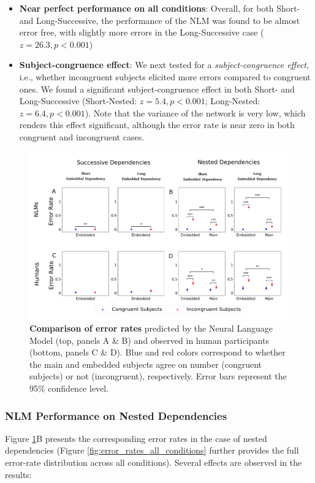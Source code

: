 \begin{itemize}
    \item \textbf{Near perfect performance on all conditions}: Overall, for both Short- and Long-Successive, the performance of the NLM was found to be almost error free, with slightly more errors in the Long-Successive case ($z=26.3, p<0.001$)
    \item \textbf{Subject-congruence effect}: We next tested for a \textit{subject-congruence effect}, i.e., whether incongruent subjects elicited more errors compared to congruent ones. We found a significant subject-congruence effect in both Short- and Long-Successive (Short-Nested: $z=5.4, p<0.001$; Long-Nested: $z=6.4, p<0.001$). Note that the variance of the network is very low, which renders this effect significant, although the error rate is near zero in both congruent and incongruent cases.
\end{itemize}
 
 \begin{figure}[ht]
    \centering
    \includegraphics[width=16cm]{figures/error_rates_plural_attractor.png}
    \caption{\textbf{Comparison of error rates} predicted by the Neural Language Model (top, panels A \& B) and observed in human participants (bottom, panels C \& D). Blue and red colors correspond to whether the main and embedded subjects agree on number (congruent subjects) or not (incongruent), respectively. Error bars represent the 95\% confidence level.}
    \label{fig:error_rates_plural_attractor}
\end{figure}


\subsubsection{NLM Performance on Nested Dependencies}
Figure \ref{fig:error_rates_plural_attractor}B presents the corresponding error rates in the case of nested dependencies (Figure \ref{fig:error_rates_all_conditions} further provides the full error-rate distribution across all conditions). Several effects are observed in the results:

